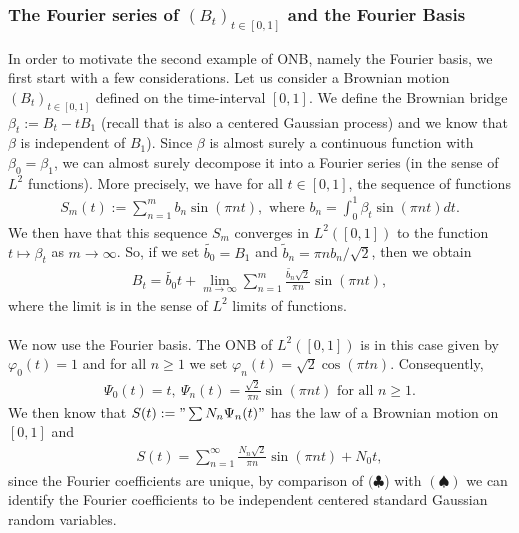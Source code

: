 \documentclass[../mainfile.tex]{subfiles}
\begin{document}
\subsubsection{The Fourier series of $(B_t)_{t \in [0,1]}$ and the Fourier Basis}
In order to motivate the second example of ONB, namely the Fourier basis, we first start with a few considerations. Let us consider a Brownian motion $(B_t)_{t \in [0,1]}$ defined on the time-interval $[0,1]$. We define the Brownian bridge $\beta_t := B_t-tB_1$ (recall that is also a centered Gaussian process) and we know that $\beta$ is independent of $B_1$). Since $\beta$ is almost surely a continuous function with $\beta_0=\beta_1$, we can almost surely decompose it into a Fourier series (in the sense of $L^2$ functions). More precisely, we have for all $t \in [0,1]$, the sequence of functions
\begin{align*}
S_m(t):= \sum_{n=1}^m b_n \sin( \pi n t ), \text{ where } b_n = \int_0^1 \beta_t \sin( \pi n t ) dt. 
\end{align*}
We then have that this sequence $S_m$ converges in $L^2 ([0,1])$ to the function $t \mapsto \beta_t$ as $m \to \infty$. So, if we set $\tilde{b_0}= B_1$ and $\tilde{b}_n = \pi n b_n / \sqrt{2}$, then we obtain 
\begin{align*}
B_t = \tilde{b_0}t + \lim_{m \to \infty} \sum_{n=1}^m \frac{\tilde{b_n} \sqrt{2}}{ \pi n} \sin ( \pi n t ), \tag{$\clubsuit$}
\end{align*}
where the limit is in the sense of $L^2$ limits of functions. \\
\\
We now use the Fourier basis. The ONB of $L^2([0,1])$ is in this case given by $\varphi_0(t)=1$ and for all $n \geq 1$ we set $\varphi_n(t)= \sqrt{2} \cos( \pi t n)$. Consequently,
\begin{align*}
\Psi_0(t)=t, \ \Psi_n(t) = \frac{\sqrt{2}}{\pi n} \sin( \pi n t) \text{ for all } n \geq 1.
\end{align*}
We then know that $S(t):= " \sum N_n \Psi_n(t)"$ has the law of a Brownian motion on $[0,1]$ and
\begin{align*}
S(t)= \sum_{n=1}^\infty  \frac{N_n\sqrt{2}}{ \pi n} \sin( \pi n t) + N_0t, \tag{$\spadesuit$}
\end{align*}
since the Fourier coefficients are unique, by comparison of $(\clubsuit$) with $(\spadesuit)$ we can identify the Fourier coefficients to be independent centered standard Gaussian random variables. 
\end{document}
